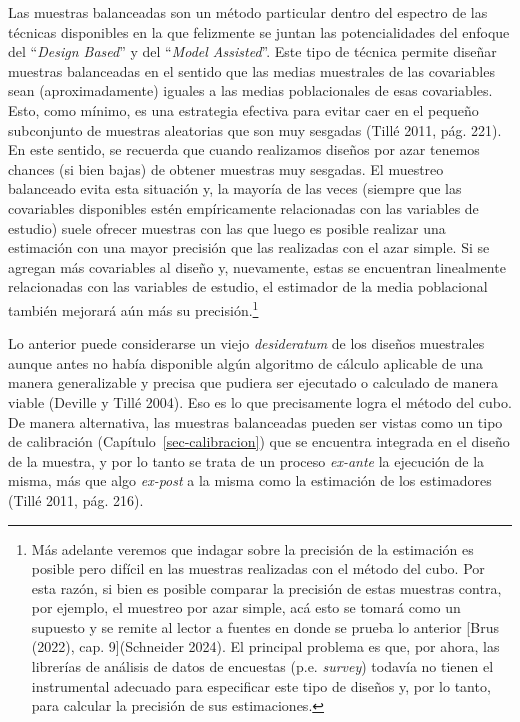 \documentclass[
  spanish,
  a4paper,
]{scrreprt}
\begin{document}
Las muestras balanceadas son un método particular dentro del espectro de
las técnicas disponibles en la que felizmente se juntan las
potencialidades del enfoque del ``\emph{Design Based}'' y del
``\emph{Model Assisted}''. Este tipo de técnica permite diseñar muestras
balanceadas en el sentido que las medias muestrales de las covariables
sean (aproximadamente) iguales a las medias poblacionales de esas
covariables. Esto, como mínimo, es una estrategia efectiva para evitar
caer en el pequeño subconjunto de muestras aleatorias que son muy
sesgadas (Tillé 2011, pág. 221). En este sentido, se recuerda que cuando
realizamos diseños por azar tenemos chances (si bien bajas) de obtener
muestras muy sesgadas. El muestreo balanceado evita esta situación y, la
mayoría de las veces (siempre que las covariables disponibles estén
empíricamente relacionadas con las variables de estudio) suele ofrecer
muestras con las que luego es posible realizar una estimación con una
mayor precisión que las realizadas con el azar simple. Si se agregan más
covariables al diseño y, nuevamente, estas se encuentran linealmente
relacionadas con las variables de estudio, el estimador de la media
poblacional también mejorará aún más su precisión.\footnote{Más adelante
  veremos que indagar sobre la precisión de la estimación es posible
  pero difícil en las muestras realizadas con el método del cubo. Por
  esta razón, si bien es posible comparar la precisión de estas muestras
  contra, por ejemplo, el muestreo por azar simple, acá esto se tomará
  como un supuesto y se remite al lector a fuentes en donde se prueba lo
  anterior {[}Brus (2022), cap. 9{]}(Schneider 2024). El principal
  problema es que, por ahora, las librerías de análisis de datos de
  encuestas (p.e. \emph{survey}) todavía no tienen el instrumental
  adecuado para especificar este tipo de diseños y, por lo tanto, para
  calcular la precisión de sus estimaciones.}

Lo anterior puede considerarse un viejo \emph{desideratum} de los
diseños muestrales aunque antes no había disponible algún algoritmo de
cálculo aplicable de una manera generalizable y precisa que pudiera ser
ejecutado o calculado de manera viable (Deville y Tillé 2004). Eso es lo
que precisamente logra el método del cubo. De manera alternativa, las
muestras balanceadas pueden ser vistas como un tipo de calibración
(Capítulo~\ref{sec-calibracion}) que se encuentra integrada en el diseño
de la muestra, y por lo tanto se trata de un proceso \emph{ex-ante} la
ejecución de la misma, más que algo \emph{ex-post} a la misma como la
estimación de los estimadores (Tillé 2011, pág. 216).
\end{document}
